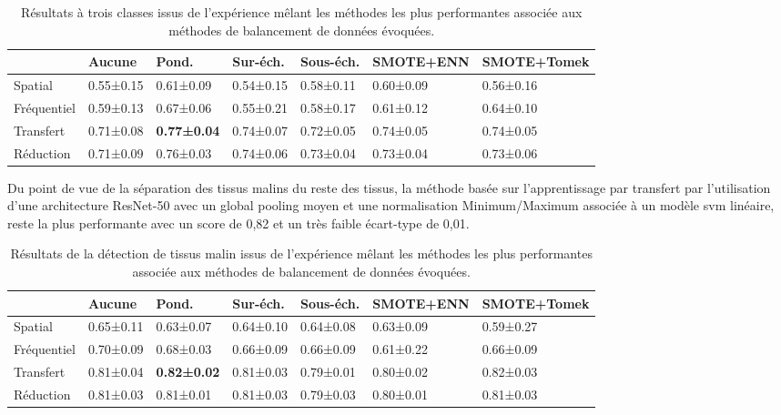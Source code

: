 \begin{table}[H]
    \begin{tabular}{lllllll}
        \toprule
                    & Aucune    & Pond.             & Sur-éch. & Sous-éch. & SMOTE+ENN & SMOTE+Tomek\\ \hline
        Spatial     & 0.55±0.15 & 0.61±0.09         & 0.54±0.15& 0.58±0.11 & 0.60±0.09 & 0.56±0.16  \\
        Fréquentiel & 0.59±0.13 & 0.67±0.06         & 0.55±0.21& 0.58±0.17 & 0.61±0.12 & 0.64±0.10  \\
        \rowcolor[HTML]{E7E6E6}
        Transfert   & 0.71±0.08 & \textbf{0.77±0.04}& 0.74±0.07& 0.72±0.05 & 0.74±0.05 & 0.74±0.05  \\
        Réduction   & 0.71±0.09 & 0.76±0.03         & 0.74±0.06& 0.73±0.04 & 0.73±0.04 & 0.73±0.06  \\
        \bottomrule
    \end{tabular}
    \caption{Résultats à trois classes issus de l'expérience mêlant les méthodes les plus performantes associée aux méthodes de balancement de données évoquées.}
    \label{tab:results_balancement_multi}
\end{table}\par

Du point de vue de la séparation des tissus malins du reste des tissus, la méthode basée sur l'apprentissage par transfert par l'utilisation d'une architecture ResNet-50 avec un global pooling moyen et une normalisation Minimum/Maximum associée à un modèle \gls{svm} linéaire, reste la plus performante avec un score de 0,82 et un très faible écart-type de 0,01.\par

\begin{table}[H]
    \begin{tabular}{lllllll}
        \toprule
                    & Aucune    & Pond.             & Sur-éch.  & Sous-éch. & SMOTE+ENN & SMOTE+Tomek\\ \hline
        Spatial     & 0.65±0.11 & 0.63±0.07         & 0.64±0.10 & 0.64±0.08 & 0.63±0.09 & 0.59±0.27  \\
        Fréquentiel & 0.70±0.09 & 0.68±0.03         & 0.66±0.09 & 0.66±0.09 & 0.61±0.22 & 0.66±0.09  \\
        \rowcolor[HTML]{E7E6E6} 
        Transfert   & 0.81±0.04 & \textbf{0.82±0.02}& 0.81±0.03 & 0.79±0.01 & 0.80±0.02 & 0.82±0.03  \\
        Réduction   & 0.81±0.03 & 0.81±0.01         & 0.81±0.03 & 0.79±0.03 & 0.80±0.01 & 0.81±0.03  \\
        \bottomrule 
    \end{tabular}
    \caption{Résultats de la détection de tissus malin issus de l'expérience mêlant les méthodes les plus performantes associée aux méthodes de balancement de données évoquées.}
    \label{tab:results_balancement_malignant}
\end{table}\par

